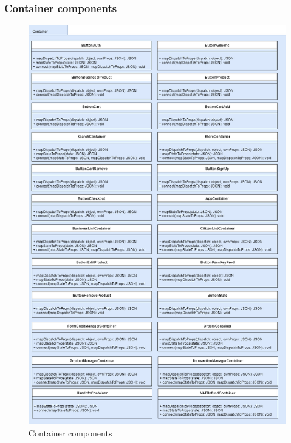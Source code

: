 \subsubsection{Container components}
\begin{figure}[H]
	\centering\includegraphics[scale = 0.4]{res/images/Container.png}
	\caption{Container components}
\end{figure}
